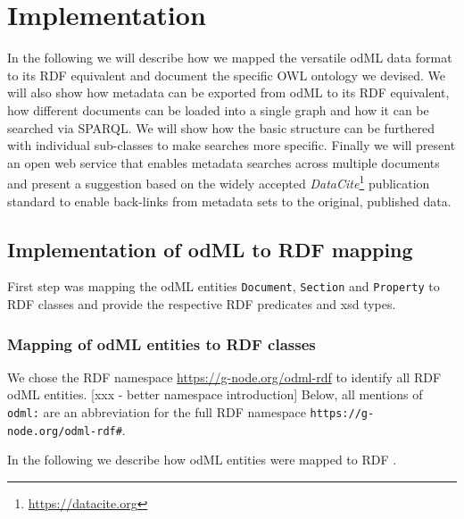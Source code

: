\documentclass{article}
\begin{document}
\section{Implementation} \label{sec:implementation}

In the following we will describe how we mapped the versatile odML data format to its RDF equivalent and document the specific OWL ontology we devised. We will also show how metadata can be exported from odML to its RDF equivalent, how different documents can be loaded into a single graph and how it can be searched via SPARQL. We will show how the basic structure can be furthered with individual sub-classes to make searches more specific. Finally we will present an open web service that enables metadata searches across multiple documents and present a suggestion based on the widely accepted \textit{DataCite}\footnote{\url{https://datacite.org}} publication standard to enable back-links from metadata sets to the original, published data.

\subsection{Implementation of odML to RDF mapping} \label{sec::odml_rdf}

First step was mapping the odML entities \texttt{Document}, \texttt{Section} and \texttt{Property} to RDF classes and provide the respective RDF predicates and xsd types.


\subsubsection{Mapping of odML entities to RDF classes} \label{sec:odml_rdf_mapping}

We chose the RDF namespace \url{https://g-node.org/odml-rdf} to identify all RDF odML entities. [xxx - better namespace introduction]
Below, all mentions of \texttt{odml:} are an abbreviation for the full RDF namespace \texttt{https://g-node.org/odml-rdf#}.

In the following we describe how odML entities were mapped to RDF .
\end{document}
